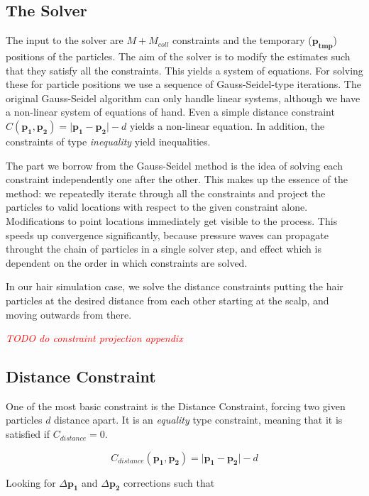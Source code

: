 \documentclass[sigplan,screen,nonacm]{acmart}
\newcommand\TODO[1]{\textcolor{red}{\emph{TODO #1}}}
\renewcommand{\b}{\boldsymbol}
\begin{document}
\subsection{The Solver}
\label{sec:solver}
The input to the solver are $M + M_{coll}$ constraints and the temporary
($\b{p_{tmp}}$) positions of the particles. The aim of the solver is to modify
the estimates such that they satisfy all the constraints. This yields a system
of equations. For solving these for particle positions we use
a sequence of Gauss-Seidel-type iterations. The original Gauss-Seidel algorithm
can only handle linear systems, although we have a non-linear system of
equations of hand. Even a simple distance constraint $ C(\b{p_1}, \b{p_2})
= \lvert \b{p_1} - \b{p_2} \rvert - d $ yields a non-linear equation. In
addition, the constraints of type \emph{inequality} yield inequalities.

The part we borrow from the Gauss-Seidel method is the idea of solving each
constraint independently one after the other. This makes up the essence of the
method: we repeatedly iterate through all the constraints and project the
particles to valid locations with respect to the given constraint alone.
Modifications to point locations immediately get visible to the process. This
speeds up convergence significantly, because pressure waves can propagate
throught the chain of particles in a single solver step, and effect which is
dependent on the order in which constraints are solved. 

In our hair simulation case, we solve the distance constraints putting the hair
particles at the desired distance from each other starting at the scalp, and
moving outwards from there.

\TODO{do constraint projection appendix}

\subsection{Distance Constraint}
One of the most basic constraint is the Distance Constraint, forcing two given
particles $d$ distance apart. It is an \emph{equality} type constraint, meaning
that it is satisfied if $C_{distance} = 0$.

\begin{equation} \label{eq:distance_constraint}
C_{distance}(\b{p_1},\b{p_2}) = \lvert \b{p_1} - \b{p_2} \rvert - d
\end{equation}

Looking for $\Delta \b{p_1}$ and $\Delta \b{p_2}$ corrections such that 
\end{document}
